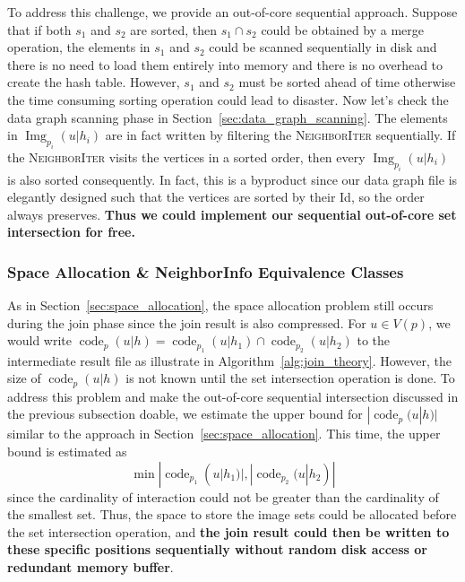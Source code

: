 To address this challenge, we provide an out-of-core sequential approach.
Suppose that if both $s_1$ and $s_2$ are sorted, then $s_1 \cap s_2$ could be obtained by a merge operation,
the elements in $s_1$ and $s_2$ could be scanned sequentially in disk and there is no need to load them entirely into memory and there is no overhead to create the hash table.
However, $s_1$ and $s_2$ must be sorted ahead of time otherwise the time consuming sorting operation could lead to disaster.
Now let's check the data graph scanning phase in Section~\ref{sec:data_graph_scanning}.
The elements in $\operatorname{Img}_{p_i}(u | h_i)$ are in fact written by filtering the \textsc{NeighborIter} sequentially.
If the \textsc{NeighborIter} visits the vertices in a sorted order, then every $\operatorname{Img}_{p_i}(u | h_i)$ is also sorted consequently.
In fact, this is a byproduct since our data graph file is elegantly designed such that the vertices are sorted by their Id, so the order always preserves.
\textbf{Thus we could implement our sequential out-of-core set intersection for free.}
\subsubsection{Space Allocation \& NeighborInfo Equivalence Classes}\label{sec:space_allocation_eqv}
As in Section~\ref{sec:space_allocation}, the space allocation problem still occurs during the join phase since the join result is also compressed.
For $u \in V(p)$, we would write $\operatorname{code}_p(u | h) = \operatorname{code}_{p_1}(u | h_1) \cap \operatorname{code}_{p_2}(u | h_2)$ to the intermediate result file as illustrate in Algorithm~\ref{alg:join_theory}.
However, the size of $\operatorname{code}_p(u | h)$ is not known until the set intersection operation is done.
To address this problem and make the out-of-core sequential intersection discussed in the previous subsection doable,
we estimate the upper bound for $|\operatorname{code}_p(u | h)|$ similar to the approach in Section~\ref{sec:space_allocation}.
This time, the upper bound is estimated as
\[ \min{|\operatorname{code}_{p_1}(u | h_1)|, |\operatorname{code}_{p_2}(u | h_2)|}\]
since the cardinality of interaction could not be greater than the cardinality of the smallest set.
Thus, the space to store the image sets could be allocated before the set intersection operation,
and \textbf{the join result could then be written to these specific positions sequentially without random disk access or redundant memory buffer}.

